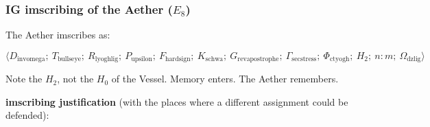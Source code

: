 \documentclass[12pt,a4paper]{article}
\begin{document}
\subsubsection{IG imscribing of the Aether ($E_8$)}

The Aether imscribes as:

\[\langle D_{\text{invomega}};\ T_{\text{bullseye}};\ R_{\text{lyoghlig}};\ P_{\text{upsilon}};\ F_{\text{hardsign}};\ K_{\text{schwa}};\ G_{\text{revapostrophe}};\ \Gamma_{\text{secstress}};\ \Phi_{\text{ctyogh}};\ H_2;\ n{:}m;\ \Omega_{\text{dzlig}} \rangle\]

Note the $H_2$, not the $H_0$ of the Vessel. Memory enters. The Aether remembers.

\textbf{imscribing justification} (with the places where a different assignment could be defended):
\end{document}
